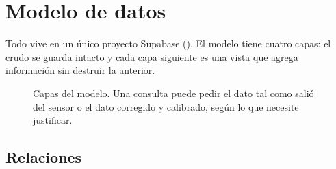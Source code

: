 \section{Modelo de datos}

Todo vive en un único proyecto Supabase (). El modelo tiene
cuatro capas: el crudo se guarda intacto y cada capa siguiente es una vista que agrega
información sin destruir la anterior.

\begin{figure}[htbp]
\centering
\resizebox{0.98\textwidth}{!}{}
\caption{Capas del modelo. Una consulta puede pedir el dato tal como salió del sensor o
el dato corregido y calibrado, según lo que necesite justificar.}
\end{figure}

\subsection{Relaciones}

